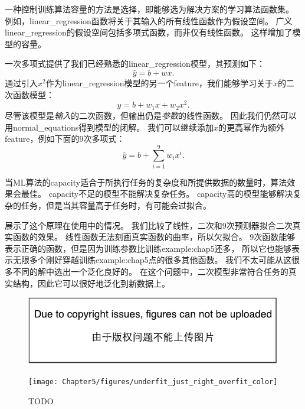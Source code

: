 一种控制训练算法容量的方法是选择，即能够选为解决方案的学习算法函数集。
例如，\gls{linear_regression}函数将关于其输入的所有线性函数作为假设空间。
广义\gls{linear_regression}的假设空间包括多项式函数，而非仅有线性函数。
这样增加了模型的容量。

一次多项式提供了我们已经熟悉的\gls{linear_regression}模型，其预测如下：
\begin{equation}
    \hat{y} = b + wx.
\end{equation}
通过引入$x^2$作为\gls{linear_regression}模型的另一个\gls{feature}，我们能够学习关于$x$的二次函数模型：
\begin{equation}
    \hat{y} = b + w_1x + w_2x^2.
\end{equation}
尽管该模型是\emph{输入}的二次函数，但输出仍是\emph{参数}的线性函数。
因此我们仍然可以用\gls{normal_equations}得到模型的闭解。
我们可以继续添加$x$的更高幂作为额外\gls{feature}，例如下面的$9$次多项式：
\begin{equation}
    \hat{y} = b + \sum_{i=1}^9 w_i x^i.
\end{equation}

当\gls{ML}算法的\gls{capacity}适合于所执行任务的复杂度和所提供数据的数量时，算法效果会最佳。
\gls{capacity}不足的模型不能解决复杂任务。
\gls{capacity}高的模型能够解决复杂的任务，但是当其容量高于任务时，有可能会过拟合。

展示了这个原理在使用中的情况。
我们比较了线性，二次和$9$次预测器拟合二次真实函数的效果。
线性函数无法刻画真实函数的曲率，所以欠拟合。
$9$次函数能够表示正确的函数，但是因为训练参数比训练\gls{example:chap5}还多， 所以它也能够表示无限多个刚好穿越训练\gls{example:chap5}点的很多其他函数。
我们不太可能从这很多不同的解中选出一个泛化良好的。
在这个问题中，二次模型非常符合任务的真实结构，因此它可以很好地泛化到新数据上。

\begin{figure}[!htb]
\ifOpenSource
\centerline{\includegraphics{figure.pdf}}
\else
\centerline{\texttt{[image: Chapter5/figures/underfit\_just\_right\_overfit\_color]}}
\fi
\caption{TODO}
\label{fig:chap5_underfit_just_right_overfit}
\end{figure}


